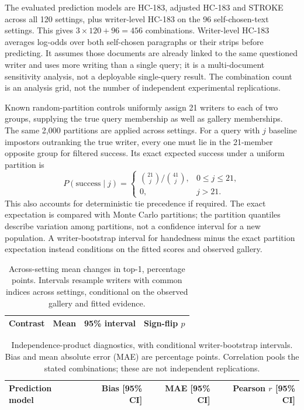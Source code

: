 \documentclass[10pt,a4paper]{article}
\begin{document}
The evaluated prediction models are HC-183, adjusted HC-183 and STROKE across all 120 settings, plus writer-level HC-183 on the 96 self-chosen-text settings. This gives $3\times120+96=456$ combinations. Writer-level HC-183 averages log-odds over both self-chosen paragraphs or their strips before predicting. It assumes those documents are already linked to the same questioned writer and uses more writing than a single query; it is a multi-document sensitivity analysis, not a deployable single-query result. The combination count is an analysis grid, not the number of independent experimental replications.

Known random-partition controls uniformly assign 21 writers to each of two groups, supplying the true query membership as well as gallery memberships. The same 2,000 partitions are applied across settings. For a query with $j$ baseline impostors outranking the true writer, every one must lie in the 21-member opposite group for filtered success. Its exact expected success under a uniform partition is
\begin{equation}
 P(\text{success}\mid j)=
 \begin{cases}
 \binom{21}{j}/\binom{41}{j},&0\leq j\leq21,\\
 0,&j>21.
 \end{cases}
\end{equation}
This also accounts for deterministic tie precedence if required. The exact expectation is compared with Monte Carlo partitions; the partition quantiles describe variation among partitions, not a confidence interval for a new population. A writer-bootstrap interval for handedness minus the exact partition expectation instead conditions on the fitted scores and observed gallery.

\begin{table}[ht]
\centering\small
\caption{Across-setting mean changes in top-1, percentage points. Intervals resample writers with common indices across settings, conditional on the observed gallery and fitted evidence.}\label{tab:aggregate}
\begin{tabular}{lrrr}\toprule
Contrast & Mean & 95\% interval & Sign-flip $p$\\\midrule

\end{tabular}
\end{table}

\begin{table}[ht]
\centering\small
\caption{Independence-product diagnostics, with conditional writer-bootstrap intervals. Bias and mean absolute error (MAE) are percentage points. Correlation pools the stated combinations; these are not independent replications.}
\begin{tabular}{lrrr}\toprule
Prediction model & Bias [95\% CI] & MAE [95\% CI] & Pearson $r$ [95\% CI]\\\midrule

\end{tabular}
\end{table}
\end{document}
